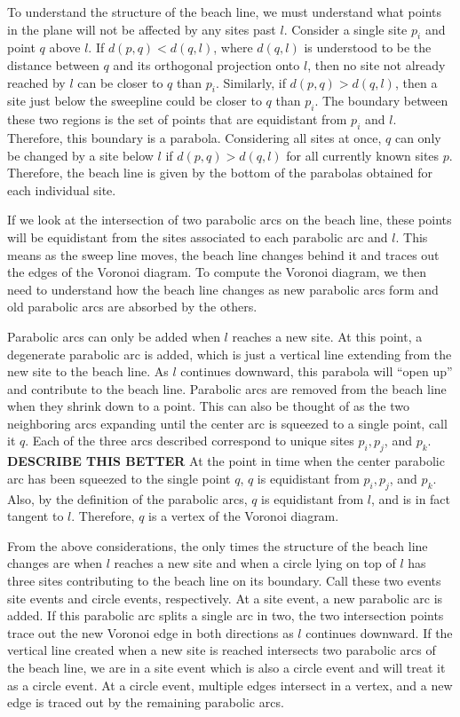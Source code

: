 \documentclass[a4paper, 11pt]{article}
\begin{document}
To understand the structure of the beach line, we must understand what points in the plane will not be affected by any sites past $l$.
Consider a single site $p_i$ and point $q$ above $l$. If $d(p,q) < d(q,l)$, where $d(q,l)$ is understood to be the distance between $q$ and its
orthogonal projection onto $l$, then
no site not already reached by $l$ can be closer to $q$ than $p_i$. Similarly, if $d(p,q) > d(q,l)$, then a site just
below the sweepline could be closer to $q$ than $p_i$. The boundary between these two regions is the set of points that are equidistant from $p_i$ and
$l$. Therefore, this boundary is a parabola. Considering all sites at once, $q$ can only be changed by a site below $l$ if $d(p,q) > d(q,l)$ for all
currently known sites $p$. Therefore, the beach line is given by the bottom of the parabolas obtained for each individual site.

If we look at the intersection of two parabolic arcs on the beach line, these points will be equidistant from the sites associated to each parabolic
arc and $l$. This means as the sweep line moves, the beach line changes behind it and traces out the edges of the Voronoi diagram. To compute the
Voronoi diagram, we then need to understand how the beach line changes as new parabolic arcs form and old parabolic arcs are absorbed by the others.

Parabolic arcs can only be added when $l$ reaches a new site. At this point, a degenerate parabolic arc is added, which is just a vertical line
extending from the new site to the beach line. As $l$ continues downward, this parabola will ``open up'' and contribute to the beach line. Parabolic
arcs are removed from the beach line when they shrink down to a point. This can also be thought of as the two neighboring arcs expanding until the
center arc is squeezed to a single point, call it $q$. Each of the three arcs described correspond to unique sites $p_i, p_j$, and $p_k$.
\textbf{DESCRIBE THIS BETTER} At the point in time when the center parabolic arc has been squeezed to the single point $q$, $q$ is equidistant from
$p_i, p_j$, and $p_k$. Also, by the definition of the parabolic arcs, $q$ is equidistant from $l$, and is in fact tangent to $l$. Therefore, $q$ is a
vertex of the Voronoi diagram.

From the above considerations, the only times the structure of the beach line changes are when $l$ reaches a new site and when a circle lying on top
of $l$ has three sites contributing to the beach line on its boundary. Call these two events site events and circle events, respectively. At a site
event, a new parabolic arc is added. If this parabolic arc splits a single arc in two, the two intersection points trace out the new Voronoi edge in
both directions as $l$ continues downward. If the vertical line created when a new site is reached intersects two parabolic arcs of the beach line, we
are in a site event which is also a circle event and will treat it as a circle event. At a circle event, multiple edges intersect in a vertex, and a
new edge is traced out by the remaining parabolic arcs.
\end{document}
